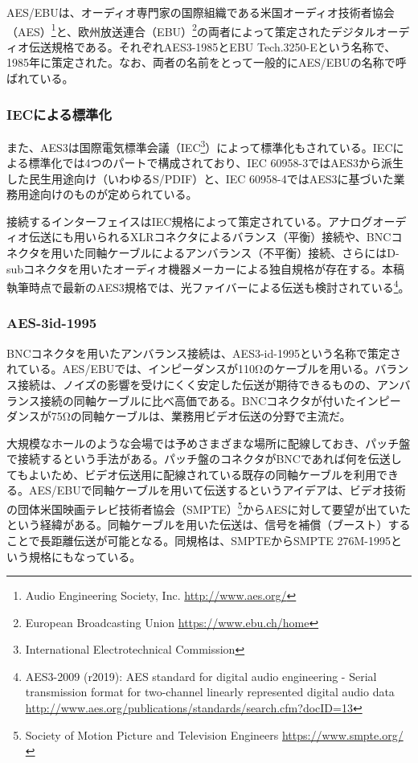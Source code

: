 AES/EBUは、オーディオ専門家の国際組織である米国オーディオ技術者協会（AES）\footnote{Audio Engineering Society, Inc. \url{http://www.aes.org/}}と、欧州放送連合（EBU）\footnote{European Broadcasting Union \url{https://www.ebu.ch/home}}の両者によって策定されたデジタルオーディオ伝送規格である。それぞれAES3-1985\cite{aes3-1985}とEBU Tech.3250-E\cite{ebutech-3250-e}という名称で、1985年に策定された。なお、両者の名前をとって一般的にAES/EBUの名称で呼ばれている。

\subsubsection{IECによる標準化}

また、AES3は国際電気標準会議（IEC\footnote{International Electrotechnical Commission}）によって標準化もされている。IECによる標準化では4つのパートで構成されており、IEC 60958-3ではAES3から派生した民生用途向け（いわゆるS/PDIF）と、IEC 60958-4ではAES3に基づいた業務用途向けのものが定められている。

接続するインターフェイスはIEC規格によって策定されている。アナログオーディオ伝送にも用いられるXLRコネクタによるバランス（平衡）接続や、BNCコネクタを用いた同軸ケーブルによるアンバランス（不平衡）接続、さらにはD-subコネクタを用いたオーディオ機器メーカーによる独自規格が存在する。本稿執筆時点で最新のAES3規格では、光ファイバーによる伝送も検討されている\footnote{AES3-2009 (r2019): AES standard for digital audio engineering - Serial transmission format for two-channel linearly represented digital audio data \url{http://www.aes.org/publications/standards/search.cfm?docID=13}}。

\subsubsection{AES-3id-1995}

BNCコネクタを用いたアンバランス接続は、AES3-id-1995という名称で策定されている。AES/EBUでは、インピーダンスが110Ωのケーブルを用いる。バランス接続は、ノイズの影響を受けにくく安定した伝送が期待できるものの、アンバランス接続の同軸ケーブルに比べ高価である。BNCコネクタが付いたインピーダンスが75Ωの同軸ケーブルは、業務用ビデオ伝送の分野で主流だ。

大規模なホールのような会場では予めさまざまな場所に配線しておき、パッチ盤で接続するという手法がある。パッチ盤のコネクタがBNCであれば何を伝送してもよいため、ビデオ伝送用に配線されている既存の同軸ケーブルを利用できる。AES/EBUで同軸ケーブルを用いて伝送するというアイデアは、ビデオ技術の団体米国映画テレビ技術者協会（SMPTE）\footnote{Society of Motion Picture and Television Engineers \url{https://www.smpte.org/}}からAESに対して要望が出ていたという経緯がある\cite{aes3id-1995-column}。同軸ケーブルを用いた伝送は、信号を補償（ブースト）することで長距離伝送が可能となる。同規格は、SMPTEからSMPTE 276M-1995という規格にもなっている。

